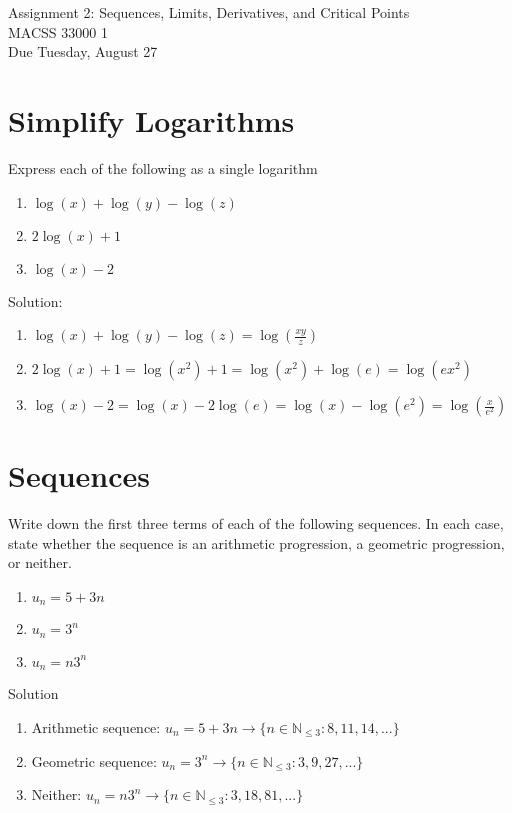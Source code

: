 \documentclass[12pt]{article}
\begin{document}
	\begin{center}
		Assignment 2: Sequences, Limits, Derivatives, and Critical Points\\
        MACSS 33000 1 \\
		Due Tuesday, August 27 \\
	\end{center}
 
\section{Simplify Logarithms}
Express each of the following as a single logarithm 
\begin{enumerate}
    \item $\log(x) + \log(y) - \log(z)$
    \item $2\log(x) + 1$
    \item $\log(x)-2$
\end{enumerate}
Solution:
\begin{enumerate}
    \item $\log(x) + \log(y) - \log(z)  = \log\left(\frac{xy}{z}\right)$
    \item $2\log(x) + 1 = \log(x^2) + 1 = \log(x^2) + \log(e) = \log(ex^2)$
    \item $\log(x)-2 = \log(x) - 2\log(e) = \log(x) - \log(e^2) = \log\left( \frac{x}{e^2}\right)$
\end{enumerate}

\section{Sequences}
Write down the first three terms of each of the following sequences. In each case, state whether the sequence is an arithmetic progression, a geometric progression, or neither. 
\begin{enumerate}
    \item $u_n = 5 + 3n$
    \item $u_n = 3^n$
    \item $u_n = n3^n$
\end{enumerate}
Solution

\begin{enumerate}
    \item Arithmetic sequence: $u_n = 5 + 3n \to \{n \in \mathbb{N}_{\leq 3}: 8,11,14,...\}$
    \item Geometric sequence: $u_n = 3^n \to \{n \in \mathbb{N}_{\leq 3}: 3,9,27,...\}$
    \item Neither: $u_n = n3^n \to \{n \in \mathbb{N}_{\leq 3}: 3,18, 81,...\}$
\end{enumerate}
\end{document}
